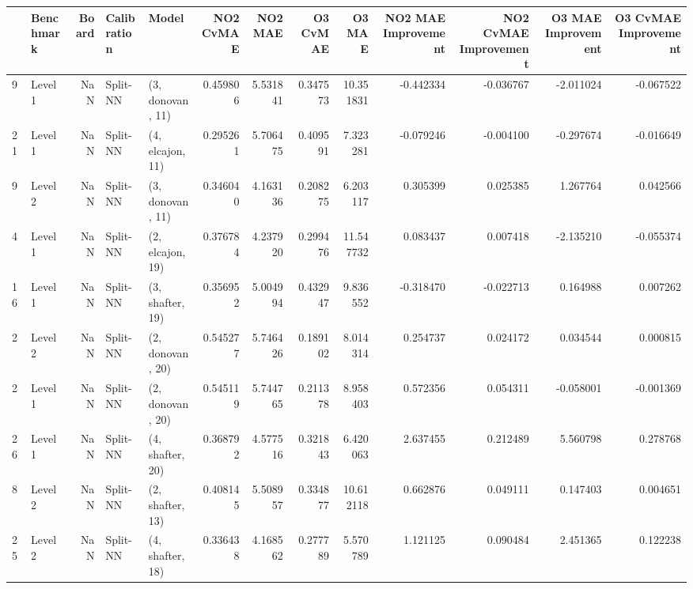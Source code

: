 \begin{tabular}{llrllrrrrrrrr}
\toprule
{} & Benchmark &  Board &    Calibration &             Model &  NO2 CvMAE &    NO2 MAE &  O3 CvMAE &     O3 MAE &  NO2 MAE Improvement &  NO2 CvMAE Improvement &  O3 MAE Improvement &  O3 CvMAE Improvement \\
\midrule
9  &   Level 1 &    NaN &       Split-NN &  (3, donovan, 11) &   0.459806 &   5.531841 &  0.347573 &  10.351831 &            -0.442334 &              -0.036767 &           -2.011024 &             -0.067522 \\
21 &   Level 1 &    NaN &       Split-NN &  (4, elcajon, 11) &   0.295261 &   5.706475 &  0.409591 &   7.323281 &            -0.079246 &              -0.004100 &           -0.297674 &             -0.016649 \\
9  &   Level 2 &    NaN &       Split-NN &  (3, donovan, 11) &   0.346040 &   4.163136 &  0.208275 &   6.203117 &             0.305399 &               0.025385 &            1.267764 &              0.042566 \\
4  &   Level 1 &    NaN &       Split-NN &  (2, elcajon, 19) &   0.376784 &   4.237920 &  0.299476 &  11.547732 &             0.083437 &               0.007418 &           -2.135210 &             -0.055374 \\
16 &   Level 1 &    NaN &       Split-NN &  (3, shafter, 19) &   0.356952 &   5.004994 &  0.432947 &   9.836552 &            -0.318470 &              -0.022713 &            0.164988 &              0.007262 \\
2  &   Level 2 &    NaN &       Split-NN &  (2, donovan, 20) &   0.545277 &   5.746426 &  0.189102 &   8.014314 &             0.254737 &               0.024172 &            0.034544 &              0.000815 \\
2  &   Level 1 &    NaN &       Split-NN &  (2, donovan, 20) &   0.545119 &   5.744765 &  0.211378 &   8.958403 &             0.572356 &               0.054311 &           -0.058001 &             -0.001369 \\
26 &   Level 1 &    NaN &       Split-NN &  (4, shafter, 20) &   0.368792 &   4.577516 &  0.321843 &   6.420063 &             2.637455 &               0.212489 &            5.560798 &              0.278768 \\
8  &   Level 2 &    NaN &       Split-NN &  (2, shafter, 13) &   0.408145 &   5.508957 &  0.334877 &  10.612118 &             0.662876 &               0.049111 &            0.147403 &              0.004651 \\
25 &   Level 2 &    NaN &       Split-NN &  (4, shafter, 18) &   0.336438 &   4.168562 &  0.277789 &   5.570789 &             1.121125 &               0.090484 &            2.451365 &              0.122238 \\

\end{tabular}
